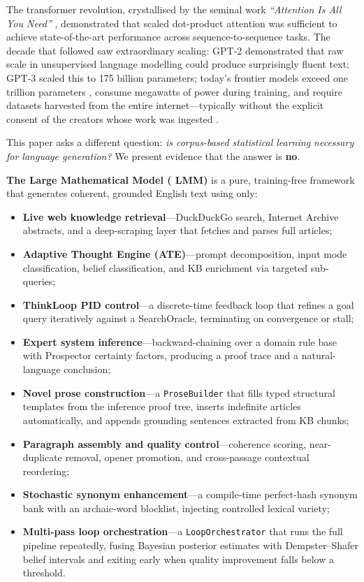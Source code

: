 \documentclass[11pt,a4paper]{article}
\newcommand{\lmm}{\texorpdfstring{%
  \textbf{\color{lmmAccent}LMM}}{LMM}}
\begin{document}
The transformer revolution, crystallised by the seminal work \textit{``Attention Is All You Need''}
\citep{vaswani2017attention}, demonstrated that scaled dot-product attention was sufficient to
achieve state-of-the-art performance across sequence-to-sequence tasks. The decade that followed saw
extraordinary scaling: GPT-2 \citep{radford2019language} demonstrated that raw scale in unsupervised
language modelling could produce surprisingly fluent text; GPT-3 \citep{brown2020language} scaled
this to 175 billion parameters; today's frontier models exceed one trillion parameters
\citep{fedus2022switch}, consume megawatts of power during training, and require datasets harvested
from the entire internet---typically without the explicit consent of the creators whose work was
ingested \citep{strubell2019energy,grynbaum2023nyt}.

This paper asks a different question: \emph{is corpus-based statistical learning necessary for
language generation?} We present evidence that the answer is \textbf{no}.

\textbf{The Large Mathematical Model (\lmm{})} is a pure, training-free framework that generates
coherent, grounded English text using only:

\begin{itemize}[noitemsep,topsep=4pt]
  \item \textbf{Live web knowledge retrieval}---DuckDuckGo search, Internet Archive abstracts, and
        a deep-scraping layer that fetches and parses full articles;
  \item \textbf{Adaptive Thought Engine (ATE)}---prompt decomposition, input mode classification,
        belief classification, and KB enrichment via targeted sub-queries;
  \item \textbf{ThinkLoop PID control}---a discrete-time feedback loop that refines a goal query
        iteratively against a SearchOracle, terminating on convergence or stall;
  \item \textbf{Expert system inference}---backward-chaining over a domain rule base with
        Prospector certainty factors, producing a proof trace and a natural-language conclusion;
  \item \textbf{Novel prose construction}---a \texttt{ProseBuilder} that fills typed structural
        templates from the inference proof tree, inserts indefinite articles automatically, and
        appends grounding sentences extracted from KB chunks;
  \item \textbf{Paragraph assembly and quality control}---coherence scoring, near-duplicate
        removal, opener promotion, and cross-passage contextual reordering;
  \item \textbf{Stochastic synonym enhancement}---a compile-time perfect-hash synonym bank with an
        archaic-word blocklist, injecting controlled lexical variety;
  \item \textbf{Multi-pass loop orchestration}---a \texttt{LoopOrchestrator} that runs the full
        pipeline repeatedly, fusing Bayesian posterior estimates with Dempster--Shafer belief
        intervals and exiting early when quality improvement falls below a threshold.
\end{itemize}
\end{document}
